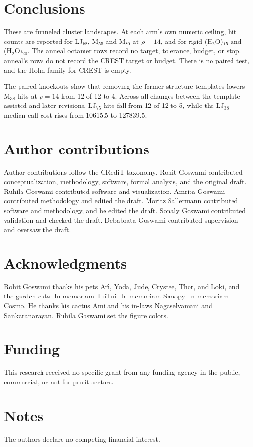 \documentclass[journal=jctcce,manuscript=article]{achemso}
\begin{document}
\section{Conclusions}
These are funneled cluster landscapes.
At each arm's own numeric ceiling, hit counts are reported for
LJ\(_{98}\), M\(_{55}\) and M\(_{80}\) at \(\rho=14\), and for rigid
(H\(_2\)O)\(_{15}\) and (H\(_2\)O)\(_{20}\).
The anneal octamer rows record no target, tolerance, budget, or stop.
anneal's rows do not record the CREST target or budget.
There is no paired test, and the Holm family for CREST is empty.

The paired knockouts show that removing the former structure templates
lowers M\(_{38}\) hits at \(\rho=14\) from 12 of 12 to 4.
Across all changes between the template-assisted and later revisions,
LJ\(_{75}\) hits fall from 12 of 12 to 5, while the LJ\(_{38}\) median call
cost rises from 10615.5 to 127839.5.

\section*{Author contributions}
Author contributions follow the CRediT taxonomy.
Rohit Goswami contributed conceptualization, methodology, software,
formal analysis, and the original draft.
Ruhila Goswami contributed software and visualization.
Amrita Goswami contributed methodology and edited the draft.
Moritz Sallermann contributed software and methodology, and he edited
the draft.
Sonaly Goswami contributed validation and checked the draft.
Debabrata Goswami contributed supervision and oversaw the draft.

\section*{Acknowledgments}
Rohit Goswami thanks his pets Ar\'{\i}, Yoda, Jude, Crystee, Thor, and
Loki, and the garden cats.
In memoriam TuiTui.
In memoriam Snoopy.
In memoriam Cosmo.
He thanks his cactus Ami and his in-laws Nagaselvamani and
Sankaranarayan.
Ruhila Goswami set the figure colors.

\section*{Funding}
This research received no specific grant from any funding agency in the
public, commercial, or not-for-profit sectors.

\section*{Notes}
The authors declare no competing financial interest.
\end{document}
